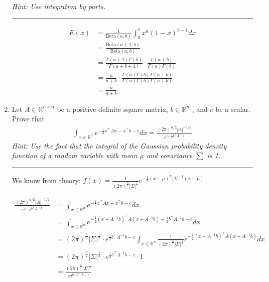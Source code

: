 \documentclass[12pt]{article}
\begin{document}
\begin{enumerate}
    \textit{Hint: Use integration by parts. }

    \noindent\rule{\linewidth}{1pt}

    \begin{align*}
        E(x) &= \frac{1}{\textrm{Beta}(a,b)} \int_0^1 x^a(1-x)^{b-1} dx \\
             &= \frac{\textrm{Beta}(a + 1,b)}{\textrm{Beta}(a,b)} \\
             &= \frac{\Gamma(a + 1)\Gamma(b)}{\Gamma(a+b+1)} \cdot \frac{\Gamma(a+b)}{\Gamma(a)\Gamma(b)} \\
             &= \frac{a}{a+b} \cdot \frac{\Gamma(a)\Gamma(b)\Gamma(a+b)}{\Gamma(a)\Gamma(b)\Gamma(a+b)} \\
             &= \frac{a}{a+b}
    \end{align*}

    
    \item Let $A \in \mathbb{R}^{n \times n}$ be a positive definite square matrix, $b \in \mathbb{R}^n$ , and $c$ be a scalar. Prove that
    \begin{align*}  
        \int_{x \in \mathbb{R}^n} e^{-\frac{1}{2} x^\intercal Ax-x^\intercal b-c } dx = \frac{(2\pi)^{n/2} |A|^{-1/2} }{e^{c{-\frac{1}{2}b^\intercal A^{-1} b}}}
    \end{align*}
    \textit{Hint: Use the fact that the integral of the Gaussian probability density function of a random variable with mean $\mu$ and covariance $\sum$ is 1.}

    \noindent\rule{\linewidth}{1pt}

    We know from theory: $f(x) = \frac{1}{(2\pi)^\frac{n}{2} |\Sigma|^{\frac{1}{2}}} e^{-\frac{1}{2}(x-\mu)^\intercal |\Sigma|^{-1} (x-\mu)}$

    \begin{align*}
        \frac{(2\pi)^{n/2} |A|^{-1/2} }{e^{c{-\frac{1}{2}b^\intercal A^{-1} b}}} &= \int_{x \in \mathbb{R}^n} e^{-\frac{1}{2} x^\intercal Ax-x^\intercal b-c } dx \\
        &= \int_{x \in \mathbb{R}^n} e^{-\frac{1}{2} (x + A^{-1} b)^\intercal A(x+A^{-1} b) + \frac{1}{2} b^\intercal A^{-1} b -c } dx \\
        &= (2\pi)^\frac{n}{2} |\Sigma|^{\frac{1}{2}} \cdot e^{\frac{1}{2} b^\intercal A^{-1} b -c} \int_{x \in \mathbb{R}^n} \frac{1}{(2\pi)^\frac{n}{2} |\Sigma|^{\frac{1}{2}}} e^{-\frac{1}{2} (x + A^{-1} b)^\intercal A(x+A^{-1} b) } dx \\
        &= (2\pi)^\frac{n}{2} |\Sigma|^{\frac{1}{2}} \cdot e^{\frac{1}{2} b^\intercal A^{-1} b -c} \cdot 1 \\
        &= \frac{(2\pi)^\frac{n}{2} |\Sigma|^{\frac{1}{2}}}{e^{\frac{1}{2} b^\intercal A^{-1} b -c}}
    \end{align*}


\end{enumerate}
\end{document}
